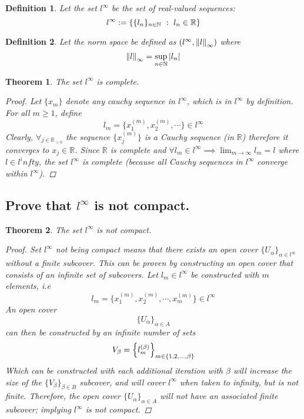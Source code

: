 \documentclass[]{article}
\newcommand{\R}{\mathbb{R}}
\newcommand{\N}{\mathbb{N}}
\newcommand{\st}{\ : \ }
\newtheorem{definition}{Definition}
\newtheorem{theorem}{Theorem}
\begin{document}
\begin{definition}
    Let the set $l^\infty$ be the set of real-valued sequences:
    \[
        l^{\infty} := \qty{\{l_n\}_{n\in \N} \st l_n \in \R}
    \]
\end{definition}
\begin{definition}
    Let the norm space be defined as $(l^\infty, \norm{l}_\infty)$ where \[\norm{l}_\infty = \sup_{n\in\N} \abs{l_n}\]
\end{definition}

\begin{theorem}
    The set $l^\infty$ is complete.
    \begin{proof}
        Let $\{x_m\}$ denote any cauchy sequence in $l^\infty$, which is in $l^\infty$ by definition.
        For all $m\geq 1$, define
        \[
            l_m = \{x_1^{(m)}, x_2^{(m)}, \cdots\} \in l^\infty
        \]
        Clearly, $\forall_{j \in \R_{>0}}$ the sequence $\{x_j^{(m)}\}$ is a Cauchy sequence (in $\R$) therefore it converges to $x_j \in \R$.
        Since $\R$ is complete and $\forall {l_m \in l^\infty} \implies \lim_{m \to \infty} l_m = l$ where $l \in l^infty$, the set $l^\infty$ is complete (because all Cauchy sequences in $l^\infty$ converge within $l^\infty$).
    \end{proof}
\end{theorem}

\subsection{Prove that $l^\infty$ is not compact.}

\begin{theorem}
    The set $l^\infty$ is not compact.
    \begin{proof}
        Set $l^\infty$ not being compact means that there exists an open cover $\{U_\alpha\}_{\alpha \in l^\infty}$ without a finite subcover.
        This can be proven by constructing an open cover that consists of an infinite set of subcovers.
        Let $l_m \in l^\infty$ be constructed with $m$ elements, i.e
        \[
            l_m = \{x_1^{(m)}, x_2^{(m)}, \cdots, x_m^{(m)}\} \in l^\infty
        \]
        An open cover $$\{U_\alpha\}_{\alpha \in A}$$ can then be constructed by an infinite number of sets
        \[
            V_\beta = \qty{l_m^{(\beta)}}_{m \in \{1, 2, \dots, \beta\}}
        \]
        Which can be constructed with each additional iteration with $\beta$ will increase the size of the $\{V_\beta\}_{\beta \in B}$ subcover, and will cover $l^\infty$ when taken to infinity, but is not finite.
        Therefore, the open cover $\{U_\alpha\}_{\alpha \in A}$ will not have an associated finite subcover; implying $l^\infty$ is not compact.
    \end{proof}
\end{theorem}
\end{document}
